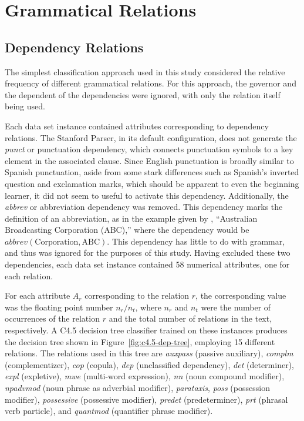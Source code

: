 \documentclass[main.tex]{subfiles}
\begin{document}
\section{Grammatical Relations}
\setcounter{section}{5}

\subsection{Dependency Relations}

The simplest classification approach used in this study considered the relative frequency of different grammatical relations. For this approach, the governor and the dependent of the dependencies were ignored, with only the relation itself being used. 

Each data set instance contained attributes corresponding to dependency relations. The Stanford Parser, in its default configuration, does not generate the \textit{punct} or punctuation dependency, which connects punctuation symbols to a key element in the associated clause. Since English punctuation is broadly similar to Spanish punctuation, aside from some stark differences such as Spanish's inverted question and exclamation marks, which should be apparent to even the beginning learner, it did not seem to useful to activate this dependency. Additionally, the \textit{abbrev} or abbreviation dependency was removed. This dependency marks the definition of an abbreviation, as in the example given by \citet{typed-deps-manual}, ``Australian Broadcasting Corporation (ABC),'' where the dependency would be $abbrev(\text{Corporation},\text{ABC})$. This dependency has little to do with grammar, and thus was ignored for the purposes of this study. Having excluded these two dependencies, each data set instance contained 58 numerical attributes, one for each relation.

      For each attribute $A_r$ corresponding to the relation $r$, the corresponding value was the floating point number $n_r/n_t$, where $n_r$ and $n_t$ were the number of occurrences of the relation $r$ and the total number of relations in the text, respectively. A C4.5 decision tree classifier trained on these instances produces the decision tree shown in Figure~\ref{fig:c4.5-dep-tree}, employing 15 different relations. The relations used in this tree are \textit{auxpass} (passive auxiliary), \textit{complm} (complementizer), \textit{cop} (copula), \textit{dep} (unclassified dependency), \textit{det} (determiner), \textit{expl} (expletive), \textit{mwe} (multi-word expression), \textit{nn} (noun compound modifier), \textit{npadvmod} (noun phrase as adverbial modifier), \textit{parataxis}, \textit{poss} (possession modifier), \textit{possessive} (possessive modifier), \textit{predet} (predeterminer), \textit{prt} (phrasal verb particle), and \textit{quantmod} (quantifier phrase modifier).
\end{document}
